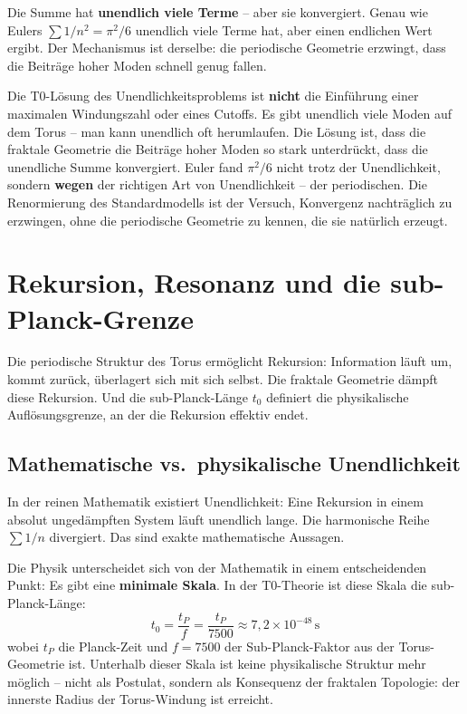 	Die Summe hat \textbf{unendlich viele Terme} -- aber sie konvergiert. Genau wie Eulers $\sum 1/n^2 = \pi^2/6$ unendlich viele Terme hat, aber einen endlichen Wert ergibt. Der Mechanismus ist derselbe: die periodische Geometrie erzwingt, dass die Beiträge hoher Moden schnell genug fallen.
	
	\begin{keypoint}
		Die T0-Lösung des Unendlichkeitsproblems ist \textbf{nicht} die Einführung einer maximalen Windungszahl oder eines Cutoffs. Es gibt unendlich viele Moden auf dem Torus -- man kann unendlich oft herumlaufen. Die Lösung ist, dass die fraktale Geometrie die Beiträge hoher Moden so stark unterdrückt, dass die unendliche Summe konvergiert. Euler fand $\pi^2/6$ nicht trotz der Unendlichkeit, sondern \textbf{wegen} der richtigen Art von Unendlichkeit -- der periodischen. Die Renormierung des Standardmodells ist der Versuch, Konvergenz nachträglich zu erzwingen, ohne die periodische Geometrie zu kennen, die sie natürlich erzeugt.
	\end{keypoint}
	
	
	\section{Rekursion, Resonanz und die sub-Planck-Grenze}
	
	Die periodische Struktur des Torus ermöglicht Rekursion: Information läuft um, kommt zurück, überlagert sich mit sich selbst. Die fraktale Geometrie dämpft diese Rekursion. Und die sub-Planck-Länge $t_0$ definiert die physikalische Auflösungsgrenze, an der die Rekursion effektiv endet.
	
	\subsection{Mathematische vs.\ physikalische Unendlichkeit}
	
	In der reinen Mathematik existiert Unendlichkeit: Eine Rekursion in einem absolut ungedämpften System läuft unendlich lange. Die harmonische Reihe $\sum 1/n$ divergiert. Das sind exakte mathematische Aussagen.
	
	Die Physik unterscheidet sich von der Mathematik in einem entscheidenden Punkt: Es gibt eine \textbf{minimale Skala}. In der T0-Theorie ist diese Skala die sub-Planck-Länge:
	\begin{equation}
		t_0 = \frac{t_P}{f} = \frac{t_P}{7500} \approx 7{,}2 \times 10^{-48} \, \text{s}
	\end{equation}
	wobei $t_P$ die Planck-Zeit und $f = 7500$ der Sub-Planck-Faktor aus der Torus-Geometrie ist. Unterhalb dieser Skala ist keine physikalische Struktur mehr möglich -- nicht als Postulat, sondern als Konsequenz der fraktalen Topologie: der innerste Radius der Torus-Windung ist erreicht.
	
